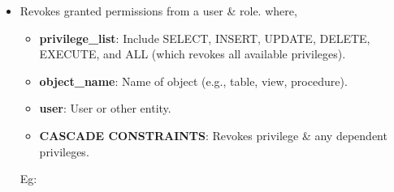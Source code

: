 
\begin{flushleft}
	
	\begin{itemize}
		\item Revokes granted permissions from a user \& role. 
		\bigskip
		where,
		\begin{itemize}
			\item \textbf{privilege\_list}: Include SELECT, INSERT, UPDATE, DELETE, EXECUTE, and ALL (which revokes all available privileges).
			
			\item \textbf{object\_name}: Name of object (e.g., table, view, procedure).
			
			\item \textbf{user}: User or other entity.
			
			\item \textbf{CASCADE CONSTRAINTS}: Revokes privilege \& any dependent privileges.
		\end{itemize}
		
		Eg:
			
	\end{itemize}
	
\end{flushleft}
